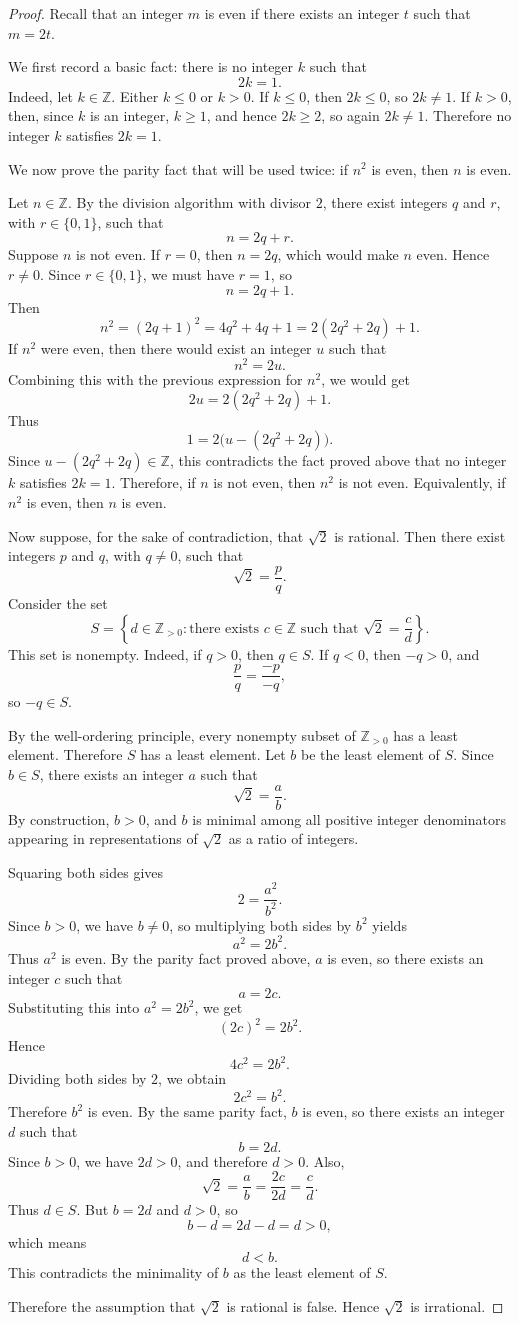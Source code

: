 \begin{proof}
Recall that an integer $m$ is even if there exists an integer $t$ such that
$m=2t$.

We first record a basic fact: there is no integer $k$ such that
\[
2k=1.
\]
Indeed, let $k\in\mathbb{Z}$. Either $k\leq 0$ or $k>0$. If $k\leq 0$,
then $2k\leq 0$, so $2k\neq 1$. If $k>0$, then, since $k$ is an
integer, $k\geq 1$, and hence $2k\geq 2$, so again $2k\neq 1$. Therefore
no integer $k$ satisfies $2k=1$.

We now prove the parity fact that will be used twice: if $n^2$ is even, then
$n$ is even.

Let $n\in\mathbb{Z}$. By the division algorithm with divisor $2$, there
exist integers $q$ and $r$, with $r\in\{0,1\}$, such that
\[
n=2q+r.
\]
Suppose $n$ is not even. If $r=0$, then $n=2q$, which would make $n$
even. Hence $r\neq 0$. Since $r\in\{0,1\}$, we must have $r=1$, so
\[
n=2q+1.
\]
Then
\[
n^2=(2q+1)^2=4q^2+4q+1=2(2q^2+2q)+1.
\]
If $n^2$ were even, then there would exist an integer $u$ such that
\[
n^2=2u.
\]
Combining this with the previous expression for $n^2$, we would get
\[
2u=2(2q^2+2q)+1.
\]
Thus
\[
1=2\bigl(u-(2q^2+2q)\bigr).
\]
Since $u-(2q^2+2q)\in\mathbb{Z}$, this contradicts the fact proved above that
no integer $k$ satisfies $2k=1$. Therefore, if $n$ is not even, then
$n^2$ is not even. Equivalently, if $n^2$ is even, then $n$ is even.

Now suppose, for the sake of contradiction, that $\sqrt{2}$ is rational. Then
there exist integers $p$ and $q$, with $q\neq 0$, such that
\[
\sqrt{2}=\frac{p}{q}.
\]
Consider the set
\[
S=\left\{ d\in \mathbb{Z}_{>0} : \text{there exists } c\in\mathbb{Z}
\text{ such that } \sqrt{2}=\frac{c}{d} \right\}.
\]
This set is nonempty. Indeed, if $q>0$, then $q\in S$. If $q<0$, then
$-q>0$, and
\[
\frac{p}{q}=\frac{-p}{-q},
\]
so $-q\in S$.

By the well-ordering principle, every nonempty subset of $\mathbb{Z}_{>0}$
has a least element. Therefore $S$ has a least element. Let $b$ be the least
element of $S$. Since $b\in S$, there exists an integer $a$ such that
\[
\sqrt{2}=\frac{a}{b}.
\]
By construction, $b>0$, and $b$ is minimal among all positive integer
denominators appearing in representations of $\sqrt{2}$ as a ratio of
integers.

Squaring both sides gives
\[
2=\frac{a^2}{b^2}.
\]
Since $b>0$, we have $b\neq 0$, so multiplying both sides by $b^2$ yields
\[
a^2=2b^2.
\]
Thus $a^2$ is even. By the parity fact proved above, $a$ is even, so there
exists an integer $c$ such that
\[
a=2c.
\]
Substituting this into $a^2=2b^2$, we get
\[
(2c)^2=2b^2.
\]
Hence
\[
4c^2=2b^2.
\]
Dividing both sides by $2$, we obtain
\[
2c^2=b^2.
\]
Therefore $b^2$ is even. By the same parity fact, $b$ is even, so there
exists an integer $d$ such that
\[
b=2d.
\]
Since $b>0$, we have $2d>0$, and therefore $d>0$. Also,
\[
\sqrt{2}=\frac{a}{b}=\frac{2c}{2d}=\frac{c}{d}.
\]
Thus $d\in S$. But $b=2d$ and $d>0$, so
\[
b-d=2d-d=d>0,
\]
which means
\[
d<b.
\]
This contradicts the minimality of $b$ as the least element of $S$.

Therefore the assumption that $\sqrt{2}$ is rational is false. Hence
$\sqrt{2}$ is irrational.
\end{proof}
